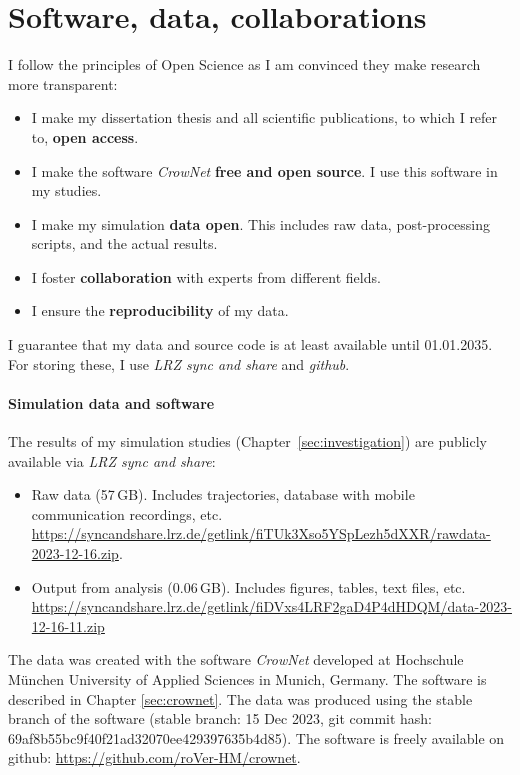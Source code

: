 





\chapter{Software, data, collaborations}
\label{sec:availability}

I follow the principles of Open Science as I am convinced they make research more transparent: 
\begin{itemize}
\item I make my dissertation thesis and all scientific publications, to which I refer to, \textbf{open access}.
\item I make the software \textit{CrowNet} \textbf{free and open source}. I use this software in my studies.
\item I make my simulation \textbf{data open}. This includes raw data, post-processing scripts, and the actual results.
\item I foster \textbf{collaboration} with experts from different fields.
\item I ensure the \textbf{reproducibility} of my data.
\end{itemize}
I guarantee that my data and source code is at least available until 01.01.2035. For storing these, I use \textit{LRZ sync and share} and \textit{github}.




\subsubsection*{Simulation data and software}
The results of my simulation studies (Chapter~\ref{sec:investigation}) are publicly available via \textit{LRZ sync and share}:
\begin{itemize}
\item  Raw data (57\,GB). Includes trajectories, database with mobile communication recordings, etc. \url{https://syncandshare.lrz.de/getlink/fiTUk3Xso5YSpLezh5dXXR/rawdata-2023-12-16.zip}. 
\item Output from analysis (0.06\,GB). Includes figures, tables, text files, etc. \url{https://syncandshare.lrz.de/getlink/fiDVxs4LRF2gaD4P4dHDQM/data-2023-12-16-11.zip}
\end{itemize} 
The data was created with the software \textit{CrowNet} developed at Hochschule München University of Applied Sciences in Munich, Germany. The software is described in Chapter \ref{sec:crownet}. The data was produced using the stable branch of the software  (stable branch: 15 Dec 2023, git commit hash: 69af8b55bc9f40f21ad32070ee429397635b4d85).
The software is freely available on github: \url{https://github.com/roVer-HM/crownet}. 

